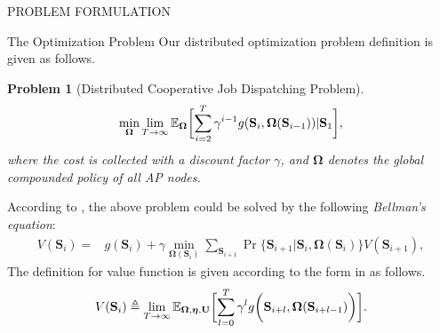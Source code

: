 \documentclass[10pt, conference, letterpaper]{IEEEtran}
\newtheorem{problem}{Problem}
\newcommand{\define}{\triangleq}
\newcommand{\vecG}{\boldsymbol}
\renewcommand{\vec}{\mathbf}
\DeclarePairedDelimiter{\Paren}{\bigg(}{\bigg)}
\DeclarePairedDelimiter{\Bracket}{\bigg[}{\bigg]}
\newcommand{\Stat}{\mathbf{S}}
\newcommand{\Policy}{\boldsymbol{\Omega}}
\newcommand{\BPolicy}{\Policy} %
\begin{document}
\begin{section}{PROBLEM FORMULATION}
\begin{subsection}{The Optimization Problem}
            Our distributed optimization problem definition is given as follows.
            \begin{problem}[Distributed Cooperative Job Dispatching Problem]
                \begin{gather}
                    \min_{\Policy} \lim_{T \to \infty}
                        \mathbb{E}_{\Policy}
                            \Bracket{\sum_{i=2}^{T} \gamma^{i-1} g(\Stat_{i}, \Policy(\Stat_{i-1}))|\Stat_1},
                \end{gather}
                where the cost is collected with a discount factor $\gamma$, and $\Policy$ denotes the global compounded policy of all AP nodes.
            \end{problem}

            According to \cite{sutton1998introduction}, the above problem could be solved by the following \emph{Bellman's equation}:
            \begin{align}
                V(\Stat_i) =& g(\Stat_i) + \gamma \min_{\BPolicy(\Stat_{i})} \sum_{\Stat_{i+1}} \Pr\{ \Stat_{i+1}|\Stat_{i}, \BPolicy(\Stat_{i}) \} V(\Stat_{i+1}),
            \end{align}
            The definition for value function is given according to the form in \cite{sutton1998introduction} as follows.
            \begin{align}
                V(\Stat_{i}) \define \lim_{T\to\infty}
                    \mathbb{E}_{\Policy,\vecG{\eta},\vec{U}} \Bracket{
                        \sum_{l=0}^{T} \gamma^l g\Paren{\Stat_{i+l}, \Policy(\Stat_{i+l-1})}
                    }.
            \end{align}


\end{subsection}
\end{section}
\end{document}
